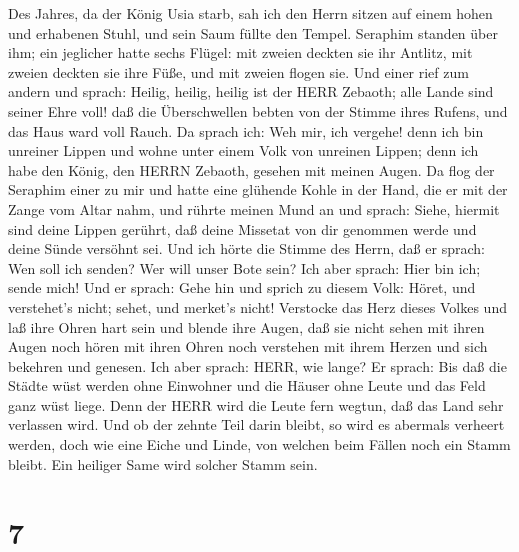  Des Jahres, da der König Usia starb, sah ich den Herrn
sitzen auf einem hohen und erhabenen Stuhl, und sein Saum füllte den
Tempel.  Seraphim standen über ihm; ein jeglicher hatte
sechs Flügel: mit zweien deckten sie ihr Antlitz, mit zweien deckten sie
ihre Füße, und mit zweien flogen sie.  Und einer rief zum
andern und sprach: Heilig, heilig, heilig ist der HERR Zebaoth; alle
Lande sind seiner Ehre voll!  daß die Überschwellen bebten
von der Stimme ihres Rufens, und das Haus ward voll Rauch. 
Da sprach ich: Weh mir, ich vergehe! denn ich bin unreiner Lippen und
wohne unter einem Volk von unreinen Lippen; denn ich habe den König, den
HERRN Zebaoth, gesehen mit meinen Augen.  Da flog der
Seraphim einer zu mir und hatte eine glühende Kohle in der Hand, die er
mit der Zange vom Altar nahm,  und rührte meinen Mund an und
sprach: Siehe, hiermit sind deine Lippen gerührt, daß deine Missetat von
dir genommen werde und deine Sünde versöhnt sei.  Und ich
hörte die Stimme des Herrn, daß er sprach: Wen soll ich senden? Wer will
unser Bote sein? Ich aber sprach: Hier bin ich; sende mich! 
Und er sprach: Gehe hin und sprich zu diesem Volk: Höret, und
verstehet's nicht; sehet, und merket's nicht!  Verstocke
das Herz dieses Volkes und laß ihre Ohren hart sein und blende ihre
Augen, daß sie nicht sehen mit ihren Augen noch hören mit ihren Ohren
noch verstehen mit ihrem Herzen und sich bekehren und genesen.
 Ich aber sprach: HERR, wie lange? Er sprach: Bis daß die
Städte wüst werden ohne Einwohner und die Häuser ohne Leute und das Feld
ganz wüst liege.  Denn der HERR wird die Leute fern wegtun,
daß das Land sehr verlassen wird.  Und ob der zehnte Teil
darin bleibt, so wird es abermals verheert werden, doch wie eine Eiche
und Linde, von welchen beim Fällen noch ein Stamm bleibt. Ein heiliger
Same wird solcher Stamm sein.

\hypertarget{section-6}{%
\section{7}\label{section-6}}

